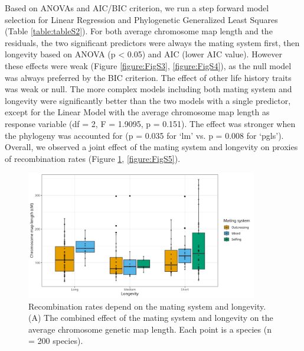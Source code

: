 \documentclass{article}
\begin{document}
Based on ANOVAs and AIC/BIC criterion, we run a step forward model selection for Linear Regression and Phylogenetic Generalized Least Squares (Table \ref{table:tableS2}). For both average chromosome map length and the residuals, the two significant predictors were always the mating system first, then longevity based on ANOVA (p < 0.05) and AIC (lower AIC value). However these effects were weak (Figure \ref{figure:FigS3}, \ref{figure:FigS4}), as the null model was always preferred by the BIC criterion. The effect of other life history traits was weak or null. The more complex models including both mating system and longevity were significantly better than the two models with a single predictor, except for the Linear Model with the average chromosome map length as response variable (df = 2, F = 1.9095, p = 0.151). The effect was stronger when the phylogeny was accounted for (p = 0.035 for ‘lm’ vs. p = 0.008 for ‘pgls’). Overall, we observed a joint effect of the mating system and longevity on proxies of recombination rates (Figure \ref{figure:Fig2}, \ref{figure:FigS5}).



\begin{figure}[h!]
  \includegraphics[width=0.9\textwidth]{figures/Fig2.jpeg}
  \centering
  \caption{Recombination rates depend on the mating system and longevity. (A) The combined effect of the mating system and longevity on the average chromosome genetic map length. Each point is a species (n = 200 species).
  }
  \label{figure:Fig2}
\end{figure}
\end{document}
